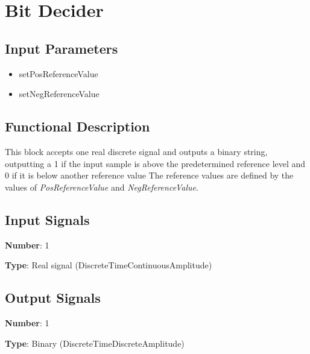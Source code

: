 \clearpage

\section{Bit Decider}

\subsection*{Input Parameters}

\begin{multicols}{2}
	\begin{itemize}
		\item setPosReferenceValue
		\item setNegReferenceValue
	\end{itemize}
\end{multicols}

\subsection*{Functional Description}

This block accepts one real discrete signal and outputs a binary string, outputting a 1 if the input sample is above the predetermined reference level and 0 if it is below another reference value The reference values are defined by the values of \textit{PosReferenceValue} and \textit{NegReferenceValue}.

\subsection*{Input Signals}

\textbf{Number}: 1

\textbf{Type}: Real signal (DiscreteTimeContinuousAmplitude)

\subsection*{Output Signals}

\textbf{Number}: 1

\textbf{Type}: Binary (DiscreteTimeDiscreteAmplitude)
